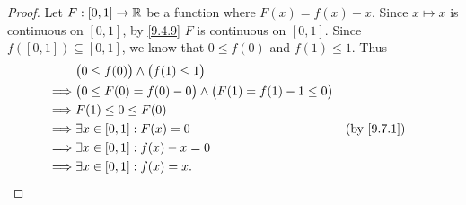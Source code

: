 \begin{proof}
  Let \(F : [0, 1] \to \mathbb{R}\) be a function where \(F(x) = f(x) - x\).
  Since \(x \mapsto x\) is continuous on \([0, 1]\), by \cref{9.4.9} \(F\) is continuous on \([0, 1]\).
  Since \(f([0, 1]) \subseteq [0, 1]\), we know that \(0 \leq f(0)\) and \(f(1) \leq 1\).
  Thus
  \begin{align*}
             & \big(0 \leq f(0)\big) \land \big(f(1) \leq 1\big)                                       \\
    \implies & \big(0 \leq F(0) = f(0) - 0\big) \land \big(F(1) = f(1) - 1 \leq 0\big)                 \\
    \implies & F(1) \leq 0 \leq F(0)                                                                   \\
    \implies & \exists x \in [0, 1] : F(x) = 0                                         &  & \by{9.7.1} \\
    \implies & \exists x \in [0, 1] : f(x) - x = 0                                                     \\
    \implies & \exists x \in [0, 1] : f(x) = x.
  \end{align*}
\end{proof}
